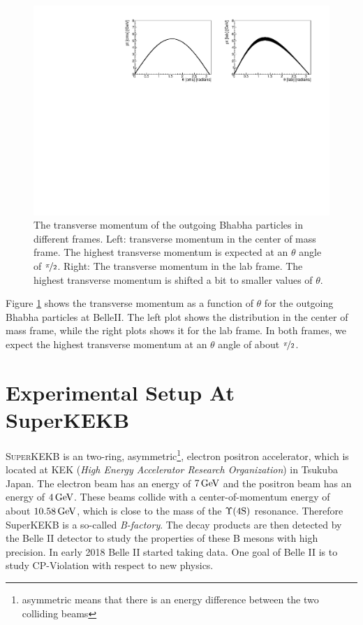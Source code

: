 \documentclass[a4paper,11pt,twosided,final,german,openbib,pdftex,listof=totoc,bibliography=totoc]{scrbook}
\begin{document}
\begin{figure}[h!]
	\centering
\includegraphics[width=\textwidth]{Bilder/CptTheta}
	\caption[$\theta$-Transverse Momentum-Distribution In The CMS And LAB Frame]{The transverse momentum of the outgoing Bhabha particles in different frames. Left: transverse momentum in the center of mass frame. The highest transverse momentum is expected at an $\theta$ angle of $\nicefrac{\pi}{2}$.  Right: The transverse momentum in the lab frame. The highest transverse momentum is shifted a bit to smaller values of $\theta$.}
	\label{fig:BelleIItMomentum}
\end{figure}


Figure \ref{fig:BelleIItMomentum} shows the transverse momentum as a function of $\theta$ for the outgoing Bhabha particles at BelleII. The left plot shows the distribution in the center of mass frame, while the right plots shows it for the lab frame. In both frames, we expect the highest transverse momentum at an $\theta$ angle of about $\nicefrac{\pi}{2}$.


\chapter{Experimental Setup At SuperKEKB}
\label{sec:SetupKEK}

\lettrine{S}{uperKEKB} is an two-ring, asymmetric\footnote{asymmetric means that there is an energy difference between the two colliding beams}, electron positron accelerator, which is located at KEK (\textit{High Energy Accelerator Research Organization}) in Tsukuba Japan. 
The electron beam has an energy of $7\,\textnormal{GeV}$ 
and the positron beam has an energy of $4\,\textnormal{GeV}$. These beams collide with a center-of-momentum energy of about $10.58\,\textnormal{GeV}$, which is close to the mass of the $\Upsilon(4\textnormal{S})$ resonance. Therefore SuperKEKB is a so-called \textit{B-factory}. The decay products are then detected by the  Belle II detector to study the properties of these B mesons with high precision. In early 2018 Belle II started taking data. One goal of Belle II is to study CP-Violation with respect to new physics.\cite{B2B}
\end{document}
